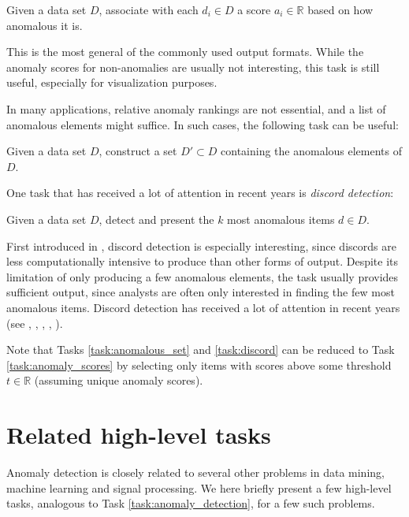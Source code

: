 \begin{task}
  \label{task:anomaly_scores}
  Given a data set $D$, associate with each $d_i \in D$ a score $a_i \in \mathbb{R}$ based on how anomalous it is.
\end{task}
This is the most general of the commonly used output formats. While the anomaly scores for non-anomalies are usually not interesting, this task is still useful, especially for visualization purposes.

In many applications, relative anomaly rankings are not essential, and a list of anomalous elements might suffice. In such cases, the following task can be useful:
\begin{task}
  \label{task:anomalous_set}
  Given a data set $D$, construct a set $D' \subset D$ containing the anomalous elements of $D$.
\end{task}

One task that has received a lot of attention in recent years is \emph{discord detection}:
\begin{task}
  \label{task:discord}
  Given a data set $D$, detect and present the $k$ most anomalous items $d \in D$.
\end{task}
First introduced in \cite{keogh1}, discord detection is especially interesting, since discords are less computationally intensive to produce than other forms of output. Despite its limitation of only producing a few anomalous elements, the task usually provides sufficient output, since analysts are often only interested in finding the few most anomalous items. Discord detection has received a lot of attention in recent years (see \cite{keogh1}, \cite{bu}, \cite{yankov}, \cite{fu}, \cite{lin}).

Note that Tasks \ref{task:anomalous_set} and \ref{task:discord} can be reduced to Task \ref{task:anomaly_scores} by selecting only items with scores above some threshold $t \in \mathbb{R}$ (assuming unique anomaly scores).

\section{Related high-level tasks}
\label{sect:related_tasks}

Anomaly detection is closely related to several other problems in data mining, machine learning and signal processing. We here briefly present a few high-level tasks, analogous to Task \ref{task:anomaly_detection}, for a few such problems.

